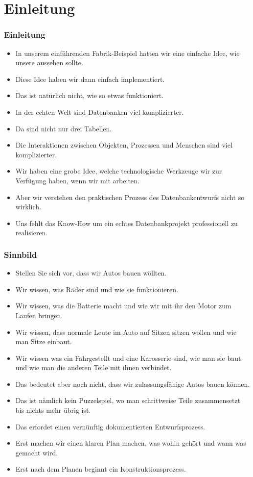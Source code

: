 \documentclass[aspectratio=169,mathserif,notheorems]{beamer}%
\subtitle{24.~Entwicklung}%
\begin{document}
%
%
\startPresentation%
%
\section{Einleitung}%
%
\begin{frame}%
\frametitle{Einleitung}%
\begin{itemize}%
\item In unserem einführenden Fabrik-Beispiel hatten wir eine einfache Idee, wie unsere  aussehen sollte.%
%
\item<2-> Diese Idee haben wir dann einfach implementiert.%
%
\item<3-> Das ist natürlich nicht, wie so etwas funktioniert.%
%
\item<4-> In der echten Welt sind Datenbanken viel komplizierter.%
%
\item<5-> Da sind nicht nur drei Tabellen.%
%
\item<6-> Die Interaktionen zwischen Objekten, Prozessen und Menschen sind viel komplizierter.%
%
\item<7-> Wir haben eine grobe Idee, welche technologische Werkzeuge wir zur Verfügung haben, wenn wir mit  arbeiten.%
%
\item<8-> Aber wir verstehen den praktischen Prozess des Datenbankentwurfs nicht so wirklich.%
%
\item<9-> Uns fehlt das Know-How um ein echtes Datenbankprojekt professionell zu realisieren.%
\end{itemize}%
\end{frame}%
%
\begin{frame}%
\frametitle{Sinnbild}%
\begin{itemize}%
%
\item Stellen Sie sich vor, dass wir Autos bauen wöllten.%
%
\item<2-> Wir wissen, was Räder sind und wie sie funktionieren.%
%
\item<3-> Wir wissen, was die Batterie macht und wie wir mit ihr den Motor zum Laufen bringen.%
%
\item<4-> Wir wissen, dass normale Leute im Auto auf Sitzen sitzen wollen und wie man Sitze einbaut.%
%
\item<5-> Wir wissen was ein Fahrgestellt und eine Karosserie sind, wie man sie baut und wie man die anderen Teile mit ihnen verbindet.%
%
\item<6-> Das bedeutet aber noch nicht, dass wir zulassungsfähige Autos bauen können.%
%
\item<7-> Das ist nämlich kein Puzzelspiel, wo man schrittweise Teile zusammensetzt bis nichts mehr übrig ist.%
%
\item<8-> Das erfordet einen vernünftig dokumentierten Entwurfsprozess.%
%
\item<9-> Erst machen wir einen klaren Plan machen, was wohin gehört und wann was gemacht wird.%
%
\item<10-> Erst nach dem Planen beginnt ein Konstruktionsprozess.%
\end{itemize}%
\end{frame}%
%
\end{document}
